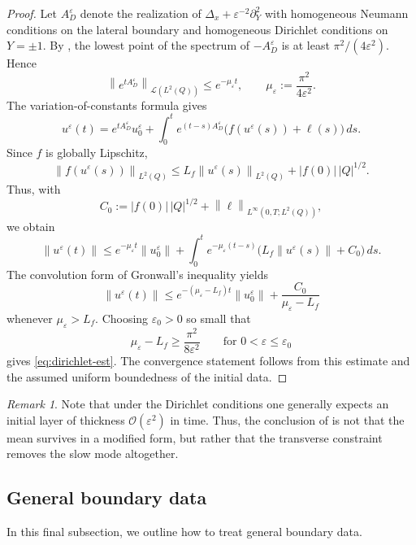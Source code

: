 \documentclass[11pt]{article}
\theoremstyle{definition}
\theoremstyle{remark}
\newtheorem{remark}[theorem]{Remark}
\numberwithin{equation}{section}
\newcommand{\eps}{\varepsilon}
\newcommand{\Q}{Q}
\newcommand{\mc}[1]{\mathcal{#1}}
\newcommand{\norm}[1]{\left\lVert#1\right\rVert}
\begin{document}
\begin{proof}
Let $A_D^\eps$ denote the realization of $\Delta_x+\eps^{-2}\partial_Y^2$ with homogeneous Neumann conditions on the lateral boundary and homogeneous Dirichlet conditions on $Y=\pm1$. By , the lowest point of the spectrum of $-A_D^\eps$ is at least $\pi^2/(4\eps^2)$. Hence
\[
\norm{e^{tA_D^\eps}}_{\mc L(L^2(\Q))}
\le e^{-\mu_\eps t},
\qquad
\mu_\eps:=\frac{\pi^2}{4\eps^2}.
\]
The variation-of-constants formula gives
\[
u^\eps(t)
=
e^{tA_D^\eps}u_0^\eps
+
\int_0^t e^{(t-s)A_D^\eps}\bigl(f(u^\eps(s))+\ell(s)\bigr)\,ds.
\]
Since $f$ is globally Lipschitz,
\[
\norm{f(u^\eps(s))}_{L^2(\Q)}
\le L_f\norm{u^\eps(s)}_{L^2(\Q)}
+ |f(0)|\,|\Q|^{1/2}.
\]
Thus, with
\[
C_0:=|f(0)|\,|\Q|^{1/2}+\norm{\ell}_{L^\infty(0,T;L^2(\Q))},
\]
we obtain
\[
\norm{u^\eps(t)}
\le
e^{-\mu_\eps t}\norm{u_0^\eps}
+
\int_0^t e^{-\mu_\eps(t-s)}
\bigl(L_f\norm{u^\eps(s)}+C_0\bigr)\,ds.
\]
The convolution form of Gronwall's inequality yields
\[
\norm{u^\eps(t)}
\le
e^{-(\mu_\eps-L_f)t}\norm{u_0^\eps}
+
\frac{C_0}{\mu_\eps-L_f}
\]
whenever $\mu_\eps>L_f$. Choosing $\eps_0>0$ so small that
\[
\mu_\eps-L_f\ge \frac{\pi^2}{8\eps^2}
\qquad\text{for }0<\eps\le\eps_0
\]
gives \eqref{eq:dirichlet-est}. The convergence statement follows from this estimate and the assumed uniform boundedness of the initial data.
\end{proof}


\begin{remark}
Note that under the Dirichlet conditions one generally expects an initial layer of thickness $\mc O(\eps^2)$ in time. 
Thus, the conclusion of  is not that the mean survives in a modified form, but rather that the transverse constraint removes the slow mode altogether.
\end{remark}

\subsection{General boundary data}\label{subsec:general-bc}

In this final subsection, we outline how to treat general boundary data.
\end{document}
